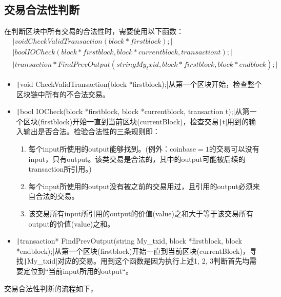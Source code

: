 \documentclass[10pt,a4paper]{article}
\begin{document}
    \subsection{交易合法性判断}
    \noindent 在判断区块中所有交易的合法性时，需要使用以下函数：
    \begin{align*}
        &\texttt|void CheckValidTransaction(block *firstblock);|\\
        &\texttt|bool IOCheck(block *firstblock, block *currentblock, transaction t);|\\ 
        &\texttt|transaction* FindPrevOutput(string My_txid, block *firstblock, block *endblock);|
    \end{align*}
    \begin{itemize}
        \item \texttt|void CheckValidTransaction(block *firstblock);|从第一个区块开始，检查整个区块链中所有的不合法交易。
        \item \texttt|bool IOCheck(block *firstblock, block *currentblock, transaction t);|从第一个区块(firstblock)开始一直到当前区块(currentBlock)，检查交易\texttt|t|用到的输入输出是否合法。检验合法性的三条规则即：
        \begin{enumerate}
            \item 每个input所使用的output能够找到。(例外：coinbase$=1$的交易可以没有input，只有output。该类交易是合法的，其中的output可能被后续的transaction所引用。)
            \item 每个input所使用的output没有被之前的交易用过，且引用的output必须来自合法的交易。
            \item 该交易所有input所引用的output的价值(value)之和大于等于该交易所有output的价值(value)之和。
        \end{enumerate}
        \item \texttt|transaction* FindPrevOutput(string My_txid, block *firstblock, block *endblock);|从第一个区块(firstblock)开始一直到当前区块(currentBlock)，寻找\texttt|My_txid|对应的交易。用到这个函数是因为执行上述1, 2, 3判断首先均需要定位到“当前input所用的output“。
    \end{itemize}
    交易合法性判断的流程如下，
\end{document}
